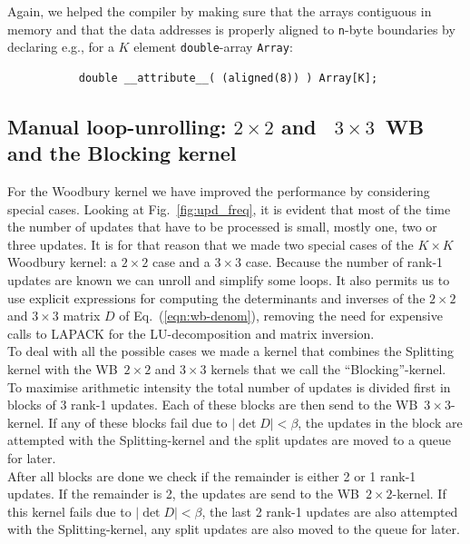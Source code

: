 \documentclass[11pt]{article}
\numberwithin{figure}{section}
\numberwithin{table}{section}
\begin{document}
        Again, we helped the compiler by making sure that the arrays contiguous in memory and that the data addresses is properly aligned to \texttt{n}-byte boundaries by declaring e.g., for a $K$ element \texttt{double}-array \texttt{Array}:
        \begin{verbatim}
           double __attribute__( (aligned(8)) ) Array[K];
        \end{verbatim}
      	 
    \subsection{Manual loop-unrolling: $2\times 2$ and ~$3\times 3$~WB and the Blocking kernel}
      For the Woodbury kernel we have improved the performance by considering special cases. Looking at Fig.~\ref{fig:upd_freq}, it is evident that most of the time the number of updates that have to be processed is small, mostly one, two or three updates. It is for that reason that we made two special cases of the $K\times K$ Woodbury kernel: a $2\times 2$ case and a $3\times 3$ case. Because the number of rank-1 updates are known we can unroll and simplify some loops. It also permits us to use explicit expressions for computing the determinants and inverses of the $2\times 2$ and $3\times 3$ matrix $D$ of Eq.~(\ref{eqn:wb-denom}), removing the need for expensive calls to LAPACK for the LU-decomposition and matrix inversion.\\
    
      To deal with all the possible cases we made a kernel that combines the Splitting kernel with the WB~$2\times 2$ and $3\times 3$ kernels that we call the ``Blocking''-kernel.\\
    
      To maximise arithmetic intensity the total number of updates is divided first in blocks of 3 rank-1 updates. Each of these blocks are then send to the  WB~$3\times 3$-kernel. If any of these blocks fail due to $\left|\det D\right|<\beta$, the updates in the block are attempted with the Splitting-kernel and the split updates are moved to a queue for later.\\
    
      After all blocks are done we check if the remainder is either 2 or 1 rank-1 updates. If the remainder is 2, the updates are send to the WB~$2\times 2$-kernel. If this kernel fails due to $\left|\det D\right|<\beta$, the last 2 rank-1 updates are also attempted with the Splitting-kernel, any split updates are also moved to the queue for later.\\
    
\end{document}
